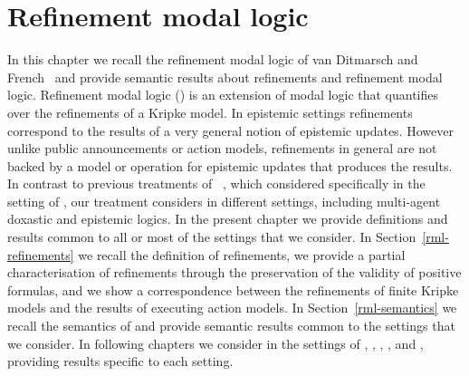 \chapter{Refinement modal logic}\label{rml}

In this chapter we recall the refinement modal logic of van Ditmarsch and French~\cite{vanditmarsch:2009} and provide semantic results about refinements and refinement modal logic.
Refinement modal logic (\logicRml{}) is an extension of modal logic that quantifies over the refinements of a Kripke model.
In epistemic settings refinements correspond to the results of a very general notion of epistemic updates.
However unlike public announcements or action models, refinements in general are not backed by a model or operation for epistemic updates that produces the results.  
In contrast to previous treatments of \logicRml{}~\cite{vanditmarsch:2009,vanditmarsch:2010}, which considered \logicRml{} specifically in the setting of \classK{}, our treatment considers \logicRml{} in different settings, including multi-agent doxastic and epistemic logics.
In the present chapter we provide definitions and results common to all or most of the settings that we consider.
In Section~\ref{rml-refinements} we recall the definition of refinements, we provide a partial characterisation of refinements through the preservation of the validity of positive formulas, and we show a correspondence between the refinements of finite Kripke models and the results of executing action models.
In Section~\ref{rml-semantics} we recall the semantics of \logicRml{} and provide semantic results common to the settings that we consider.
In following chapters we consider \logicRml{} in the settings of \classK{}, \classKFF{}, \classKD{}, \classS{}, and \classKF{}, providing results specific to each setting.



